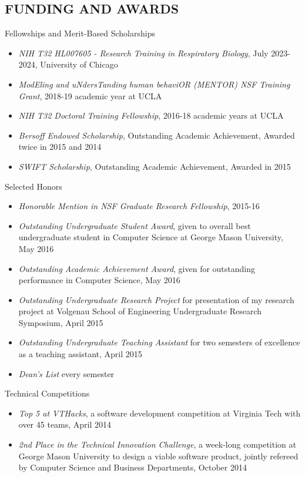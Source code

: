 \documentclass[margin, 10pt]{res} %
\begin{document}
\begin{resume}
\section{FUNDING AND AWARDS}

Fellowships and Merit-Based Scholarships
\begin{itemize} \itemsep -2pt %
\item {\sl NIH T32 HL007605 - Research Training in Respiratory Biology}, July 2023-2024, University of Chicago
\item {\sl ModEling and uNdersTanding human behaviOR (MENTOR) NSF Training Grant}, 2018-19 academic year at UCLA
\item {\sl NIH T32 Doctoral Training Fellowship}, 2016-18 academic years at UCLA
\item {\sl Bersoff Endowed Scholarship}, Outstanding Academic Achievement, Awarded twice in 2015 and 2014
\item {\sl SWIFT Scholarship}, Outstanding Academic Achievement, Awarded in 2015
\end{itemize}

Selected Honors
\begin{itemize} \itemsep -2pt %
\item {\sl Honorable Mention in NSF Graduate Research Fellowship}, 2015-16
\item {\sl Outstanding Undergraduate Student Award}, given to overall best undergraduate student in Computer Science at George Mason University, May 2016
\item {\sl Outstanding Academic Achievement Award}, given for outstanding performance in Computer Science, May 2016
\item {\sl Outstanding Undergraduate Research Project} for presentation of my research project at Volgenau School of Engineering Undergraduate Research Symposium, April 2015
\item {\sl Outstanding Undergraduate Teaching Assistant} for two semesters of excellence as a teaching assistant, April 2015
\item {\sl Dean's List} every semester
\end{itemize}


Technical Competitions
\begin{itemize} \itemsep -2pt %
\item {\sl Top 5 at VTHacks}, a software development competition at Virginia Tech with over 45 teams, April 2014
\item {\sl 2nd Place in the Technical Innovation Challenge}, a week-long competition at George Mason University to design a viable software product, jointly refereed by Computer Science and Business Departments, October 2014
\end{itemize}




\end{resume}
\end{document}
